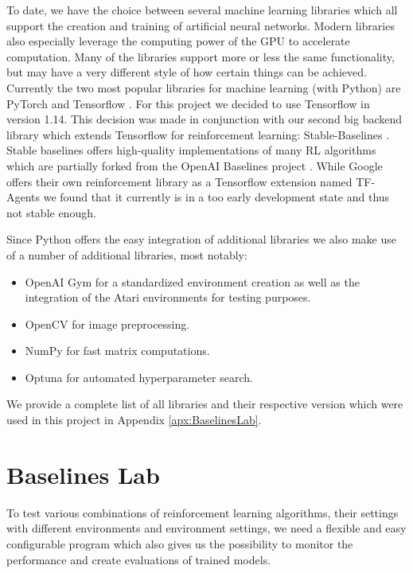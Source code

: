 To date, we have the choice between several machine learning libraries which all support the creation and training of artificial neural networks. Modern libraries also especially leverage the computing power of the GPU to accelerate computation. Many of the libraries support more or less the same functionality, but may have a very different style of how certain things can be achieved. Currently the two most popular libraries for machine learning (with Python) are PyTorch \cite{paszke2019pytorch} and Tensorflow \cite{abadi2016tensorflow}. For this project we decided to use Tensorflow in version 1.14. This decision was made in conjunction with our second big backend library which extends Tensorflow for reinforcement learning: Stable-Baselines \cite{stable-baselines}. Stable baselines offers high-quality implementations of many RL algorithms which are partially forked from the OpenAI Baselines project \cite{baselines}. While Google offers their own reinforcement library as a Tensorflow extension named TF-Agents \cite{TFAgents} we found that it currently is in a too early development state and thus not stable enough.

Since Python offers the easy integration of additional libraries we also make use of a number of additional libraries, most notably:
\begin{itemize}
    \item OpenAI Gym \cite{openAIgym} for a standardized environment creation as well as the integration of the Atari environments for testing purposes.
    \item OpenCV \cite{opencv_library} for image preprocessing.
    \item NumPy \cite{oliphant2006guide} for fast matrix computations.
    \item Optuna \cite{akiba2019optuna} for automated hyperparameter search.
\end{itemize}

We provide a complete list of all libraries and their respective version which were used in this project in Appendix \ref{apx:BaselinesLab}.  

\section{Baselines Lab} \label{sec:BaselinesLab}
To test various combinations of reinforcement learning algorithms, their settings with different environments and environment settings, we need a flexible and easy configurable program which also gives us the possibility to monitor the performance and create evaluations of trained models. 

